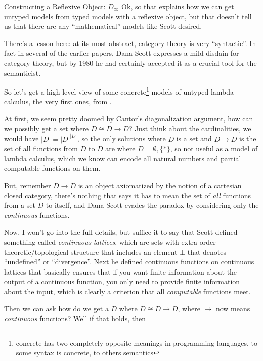 \documentclass{article}
\begin{document}
\begin{section}{Constructing a Reflexive Object: $D_{\infty}$}
  Ok, so that explains how we can get untyped models from typed models
  with a reflexive object, but that doesn't tell us that there are any
  ``mathematical'' models like Scott desired.

  There's a lesson here: at its most abstract, category theory is very
  ``syntactic''. In fact in several of the earlier papers, Dana Scott
  expresses a mild disdain for category theory, but by 1980 he had
  certainly accepted it as a crucial tool for the semanticist.

  So let's get a high level view of some concrete\footnote{concrete
    has two completely opposite meanings in programming languages, to
    some syntax is concrete, to others semantics} models of untyped
  lambda calculus, the very first ones, from
  \cite{scott1972continuous}.

  At first, we seem pretty doomed by Cantor's diagonalization
  argument, how can we possibly get a set where $D \cong D \to D$?
  Just think about the cardinalities, we would have $|D| = |D|^{|D|}$,
  so the only solutions where $D$ is a set and $D \to D$ is the set of
  all functions from $D$ to $D$ are where $D = \emptyset,\{*\}$, so
  not useful as a model of lambda calculus, which we know can encode
  all natural numbers and partial computable functions on them.

  But, remember $D \to D$ is an object axiomatized by the notion of a
  cartesian closed category, there's nothing that says it has to mean
  the set of \emph{all} functions from a set $D$ to itself, and Dana
  Scott evades the paradox by considering only the \emph{continuous}
  functions.

  Now, I won't go into the full details, but suffice it to say that
  Scott defined something called \emph{continuous lattices}, which are
  sets with extra order-theoretic/topological structure that includes
  an element $\bot$ that denotes ``undefined'' or ``divergence''. Next
  he defined continuous functions on continuous lattices that
  basically ensures that if you want finite information about the
  output of a continuous function, you only need to provide finite
  information about the input, which is clearly a criterion that all
  \emph{computable} functions meet.

  Then we can ask how do we get a $D$ where $D \cong D \to D$, where
  $\to$ now means \emph{continuous} functions? Well if that holds,
  then


\end{section}
\end{document}
